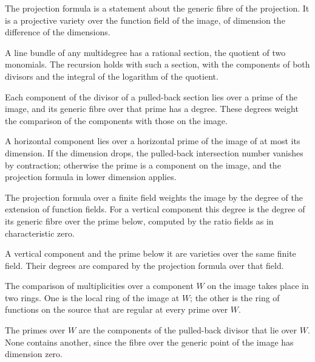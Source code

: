 The projection formula is a statement about the generic fibre of the projection. It is a projective variety over the
function field of the image, of dimension the difference of the dimensions.

A line bundle of any multidegree has a rational section, the quotient of two monomials. The recursion holds with such
a section, with the components of both divisors and the integral of the logarithm of the quotient.

Each component of the divisor of a pulled-back section lies over a prime of the image, and its generic fibre over that
prime has a degree. These degrees weight the comparison of the components with those on the image.

A horizontal component lies over a horizontal prime of the image of at most its dimension. If the dimension drops, the
pulled-back intersection number vanishes by contraction; otherwise the prime is a component on the image, and the
projection formula in lower dimension applies.

The projection formula over a finite field weights the image by the degree of the extension of function fields. For a
vertical component this degree is the degree of its generic fibre over the prime below, computed by the ratio fields as
in characteristic zero.

A vertical component and the prime below it are varieties over the same finite field. Their degrees are compared by the
projection formula over that field.

The comparison of multiplicities over a component $W$ on the image takes place in two rings. One is the local ring of
the image at $W$; the other is the ring of functions on the source that are regular at every prime over $W$.

The primes over $W$ are the components of the pulled-back divisor that lie over $W$. None contains another, since the
fibre over the generic point of the image has dimension zero.

